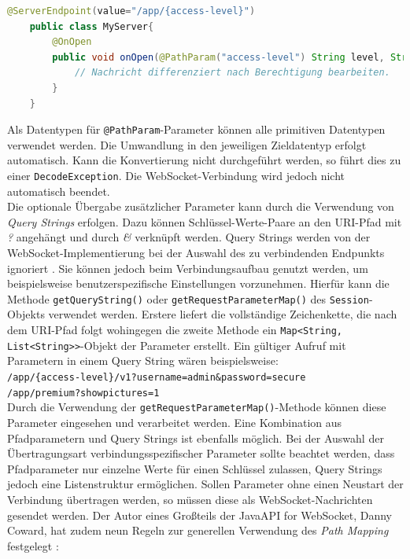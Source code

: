 \documentclass[11pt,a4paper,titlepage]{scrartcl}
\numberwithin{equation}{section}
\begin{document}
\begin{lstlisting}[frame=single, language=Java, caption=Java: PathParam]
	@ServerEndpoint(value="/app/{access-level}")
	public class MyServer{
		@OnOpen
		public void onOpen(@PathParam("access-level") String level, String message) {
			// Nachricht differenziert nach Berechtigung bearbeiten.
		}
	}
\end{lstlisting}

\noindent Als Datentypen für \texttt{@PathParam}-Parameter können alle primitiven Datentypen verwendet werden. Die Umwandlung in den jeweiligen Zieldatentyp erfolgt automatisch. Kann die Konvertierung nicht durchgeführt werden, so führt dies zu einer \texttt{DecodeException}. Die WebSocket-Verbindung wird jedoch nicht automatisch beendet.\\

\noindent Die optionale Übergabe zusätzlicher Parameter kann durch die Verwendung von \textit{Query Strings} erfolgen. Dazu können Schlüssel-Werte-Paare an den URI-Pfad mit \textit{?} angehängt und durch \textit{\&} verknüpft werden. Query Strings werden von der WebSocket-Implementierung bei der Auswahl des zu verbindenden Endpunkts ignoriert \autocite[156]{coward_java_2014}. Sie können jedoch beim Verbindungsaufbau genutzt werden, um beispielsweise benutzerspezifische Einstellungen vorzunehmen. Hierfür kann die Methode \texttt{getQueryString()} oder \texttt{getRequestParameterMap()} des \texttt{Session}-Objekts verwendet werden. Erstere liefert die vollständige Zeichenkette, die nach dem URI-Pfad folgt wohingegen die zweite Methode ein \texttt{Map<String, List<String>{}>}-Objekt der Parameter erstellt. Ein gültiger Aufruf mit Parametern in einem Query String wären beispielsweise:\\

\noindent\texttt{/app/\{access-level\}/v1?username=admin\&password=secure}\\
\noindent\texttt{/app/premium?showpictures=1}\\

\noindent Durch die Verwendung der \texttt{getRequestParameterMap()}-Methode können diese Parameter eingesehen und verarbeitet werden. Eine Kombination aus Pfadparametern und Query Strings ist ebenfalls möglich. Bei der Auswahl der Übertragungsart verbindungsspezifischer Parameter sollte beachtet werden, dass Pfadparameter nur einzelne Werte für einen Schlüssel zulassen, Query Strings jedoch eine Listenstruktur ermöglichen. Sollen Parameter ohne einen Neustart der Verbindung übertragen werden, so müssen diese als WebSocket-Nachrichten gesendet werden. Der Autor eines Großteils der Java\texttrademark API for WebSocket, Danny Coward, hat zudem neun Regeln zur generellen Verwendung des \textit{Path Mapping} festgelegt \autocite[146-159]{coward_java_2014}:
\end{document}
